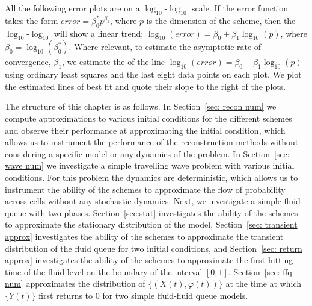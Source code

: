 All the following error plots are on a \(\log_{10}\)-\(\log_{10}\) scale. If the error function takes the form \(error = \beta_0^* p^{\beta_1}\), where \(p\) is the dimension of the scheme, then the \(\log_{10}\)-\(\log_{10}\) will show a linear trend; \(\log_{10}(error) = \beta_0 + \beta_1 \log_{10}(p)\), where \(\beta_0=\log_{10}(\beta_0^*)\). Where relevant, to estimate the asymptotic rate of convergence, \(\beta_1\), we estimate the of the line \(\log_{10}(error) = \beta_0 + \beta_1 \log_{10}(p)\) using ordinary least squares and the last eight data points on each plot. We plot the estimated lines of best fit and quote their slope to the right of the plots. 

The structure of this chapter is as follows. In Section~\ref{sec: recon num} we compute approximations to various initial conditions for the different schemes and observe their performance at approximating the initial condition, which allows us to instrument the performance of the reconstruction methods without considering a specific model or any dynamics of the problem. In Section~\ref{sec: wave num} we investigate a simple travelling wave problem with various initial conditions. For this problem the dynamics are deterministic, which allows us to instrument the ability of the schemes to approximate the flow of probability across cells without any stochastic dynamics. Next, we investigate a simple fluid queue with two phases. Section~\ref{sec:stat} investigates the ability of the schemes to approximate the stationary distribution of the model, Section~\ref{sec: transient approx} investigates the ability of the schemes to approximate the transient distribution of the fluid queue for two initial conditions, and Section~\ref{sec: return approx} investigates the ability of the schemes to approximate the first hitting time of the fluid level on the boundary of the interval \([0,1]\). Section~\ref{sec: ffq num} approximates the distribution of \(\{(X(t),\varphi(t))\}\) at the time at which \(\{Y(t)\}\) first returns to \(0\) for two simple fluid-fluid queue models.  




	


